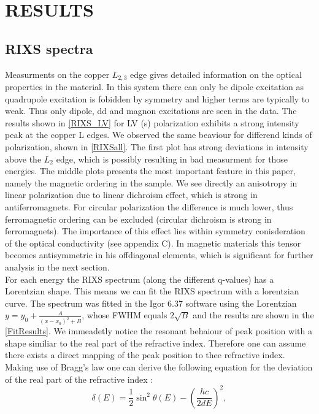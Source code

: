 \documentclass[twocolumn,amsmath,superscriptaddress,amssymb]{revtex4-1}
\begin{document}
\section{RESULTS}
\subsection{RIXS spectra}
Measurments on the copper $L_{2,3}$ edge gives detailed information on the optical properties in the material. In this system there can only be dipole excitation as quadrupole excitation is fobidden by symmetry and higher terms are typically to weak. Thus only dipole, dd and magnon excitations are seen in the data. The results shown in \ref{RIXS_LV} for LV (s) polarization exhibits a strong intensity peak at the copper L edges. We observed the same beaviour for differend kinds of polarization, shown in \ref{RIXSall}. The first plot has strong deviations in intensity above the $L_2$ edge, which is possibly resulting in bad measurment for those energies. The middle plots presents the most important feature in this paper, namely the magnetic ordering in the sample. We see directly an anisotropy in linear polarization due to linear dichroism effect, which is strong in antiferromagnets. 
For circular polarization the difference is much lower, thus ferromagnetic ordering can be excluded (circular dichroism is strong in ferromagnets). The importance of this effect lies within symmetry conisderation of the optical conductivity (see appendix C). In magnetic materials this tensor becomes antisymmetric in his offdiagonal elements, which is significant for further analysis in the next section.\\
\indent For each energy the RIXS spectrum (along the different q-values) has a Lorentzian shape. This means we can fit the RIXS spectrum with a lorentzian curve. The spectrum was fitted in the Igor 6.37 software using the Lorentzian $y=y_0+\frac{ A}{(x-x_0)^2+B}$, whose FWHM equals $2\sqrt{B}$ and the results are shown in the \ref{FitResults}. We immeadetly notice the resonant behaiour of peak position with a shape similiar to the real part of the refractive index. Therefore one can assume there exists a direct mapping of the peak position to thee refractive index. Making use of Bragg's law one can derive the following equation for the deviation of the real part of the refractive index \cite{Seve}:
\begin{equation}\label{RefRe}
\delta\left(E\right)=\frac{1}{2}\sin^2\theta\left(E\right)-\left(\frac{hc}{2dE}\right)^2,
\end{equation}
\end{document}
